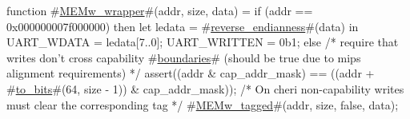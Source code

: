 function #\hyperref[zMEMwzywrapper]{MEMw\_wrapper}#(addr, size, data) =
  if (addr == 0x000000007f000000) then
  {
    let ledata   = #\hyperref[zreversezyendianness]{reverse\_endianness}#(data) in
    UART_WDATA   = ledata[7..0];
    UART_WRITTEN = 0b1;
  }
  else
  {
    /* require that writes don't cross capability #\hyperref[zboundaries]{boundaries}# (should be true due to mips alignment requirements) */  
    assert((addr & cap_addr_mask) == ((addr + #\hyperref[ztozybits]{to\_bits}#(64, size - 1)) & cap_addr_mask));
    /* On cheri non-capability writes must clear the corresponding tag */
    #\hyperref[zMEMwzytagged]{MEMw\_tagged}#(addr, size, false, data);
  }
